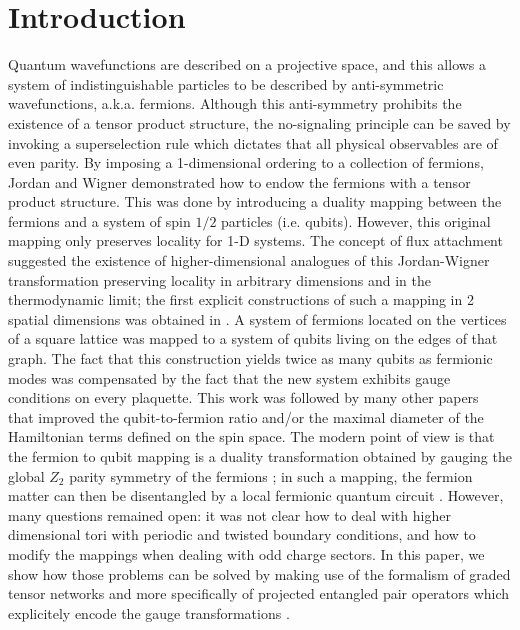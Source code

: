 \documentclass[aps,prx,twocolumn,floatfix,10pt,amssymb,amsfont,amsmath,superscriptaddress,float,nofootinbib,longbibliography,nobalancelastpage]{revtex4-2}
\begin{document}
\section{Introduction}
Quantum wavefunctions are described on a projective space, and this allows a system of indistinguishable particles to be described by anti-symmetric wavefunctions, a.k.a. fermions. Although this anti-symmetry prohibits the existence of a tensor product structure, the no-signaling principle can be saved by invoking a super\-selection rule which dictates that all physical observables are of even parity. By imposing a 1-dimensional ordering to a collection of fermions,  Jordan and Wigner \cite{jordan1993paulische} demonstrated how to endow the fermions with a tensor product structure. This was done by introducing a duality mapping between the fermions and a system of spin $1/2$ particles (i.e. qubits). However, this original mapping only preserves locality for 1-D systems. The concept of flux attachment \cite{Jain,Lopez,Halperin} suggested the existence of higher-dimensional analogues of this Jordan-Wigner transformation preserving locality in arbitrary dimensions and in the thermodynamic limit;  the first explicit constructions of such a mapping in 2 spatial dimensions was obtained in \cite{bravyi_fermionic_2002,Verstraete_2005,Ball_gauge}. A system of fermions located on the vertices of a square lattice was mapped to a system of qubits living on the edges of that graph. The fact that this construction yields twice as many qubits as fermionic modes was compensated by the fact that the new system exhibits gauge conditions on every plaquette. This work was followed by many other papers ~\cite{seeley_bravyi-kitaev_2012,Tranter:2015nri,hastings2015, Whitfield:2016lhw,Havl_ek_2017,Setia_2019, steudtner_quantum_2019,jiang2019,Backens_2019,Jiang_2020, Derby_2021, Chiew_2023,Miller_2023,chen_equivalence_2023, PhysRevB.109.115149} that improved the qubit-to-fermion ratio and/or the maximal diameter of the Hamiltonian terms defined on the spin space. The modern point of view is that the fermion to qubit mapping is a duality transformation obtained by gauging the global $Z_2$ parity symmetry of the fermions \cite{Chen_2018}; in such a mapping, the fermion matter can then be disentangled by a local fermionic quantum circuit \cite{Zohar_2018}. However, many questions remained open: it was not clear how to deal with higher dimensional tori with periodic and twisted boundary conditions, and how to modify the mappings when dealing with odd charge sectors. In this paper, we show how those problems can be solved by making use of the formalism of graded tensor networks \cite{Bultinck_2017,Cirac_2021} and more specifically of projected entangled pair operators which explicitely encode the  gauge transformations \cite{Haegeman_2015,Shukla_2020}.
\end{document}
